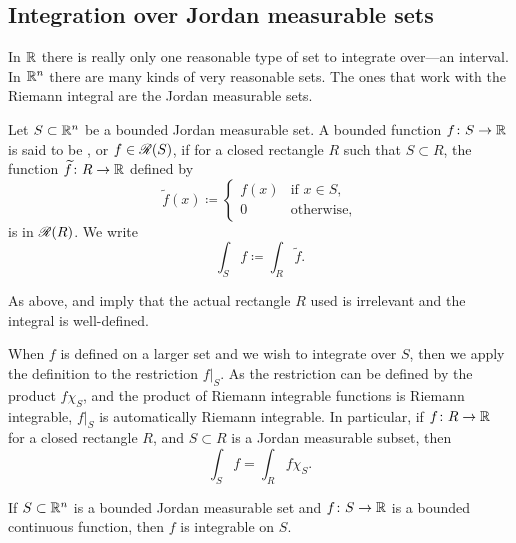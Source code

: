 \subsection{Integration over Jordan measurable sets}

In ${\mathbb{R}}$ there is really only one reasonable type of set to
integrate over---an interval.
In ${\mathbb{R}}^n$ there are many kinds of very reasonable sets.  The ones
that work with the Riemann integral are the Jordan measurable sets.

\begin{defn}
Let $S \subset {\mathbb{R}}^n$ be a bounded Jordan measurable set.
A bounded function $f \colon S \to {\mathbb{R}}$
is said to be
\emph{},
or $f \in {\mathscr{R}}(S)$, if for a closed
rectangle $R$ such that $S \subset R$, the function $\widetilde{f} \colon R
\to {\mathbb{R}}$ defined by
\begin{equation*}
\widetilde{f}(x) \coloneqq
\begin{cases}
f(x) & \text{if } x \in S, \\
0 & \text{otherwise},
\end{cases}
\end{equation*}
is in ${\mathscr{R}}(R)$.  We write
%
\begin{equation*}
\int_S f \coloneqq \int_R \widetilde{f}.
\end{equation*}
\end{defn}

As above,
and  imply that
the actual rectangle $R$  used is irrelevant and
the integral is well-defined.

When $f$ is defined on a larger set and we wish to integrate over $S$, then
we apply the definition to the restriction $f|_S$.
As the restriction can be defined by the product $f\chi_S$, and the product
of Riemann integrable functions is Riemann integrable, $f|_S$ is automatically
Riemann integrable.
In particular, 
if $f \colon R \to {\mathbb{R}}$ for a closed rectangle $R$, and $S \subset R$ is
a Jordan measurable subset, then
\begin{equation*}
\int_S f = \int_R f \chi_S .
\end{equation*}

\begin{prop}
If $S \subset {\mathbb{R}}^n$ is a bounded Jordan measurable set and $f \colon S \to {\mathbb{R}}$
is a bounded continuous function, then $f$ is integrable on $S$.
\end{prop}

